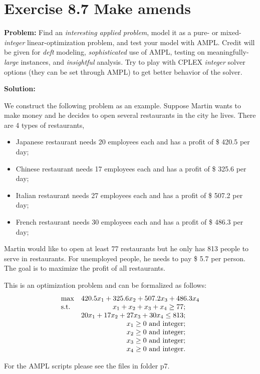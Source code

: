 \section{Exercise 8.7 Make amends}
\textbf{Problem:} Find an \textit{interesting applied problem}, model it as a pure- or mixed-\textit{integer} linear-optimization problem, and test your model with AMPL. Credit will be given for \textit{deft} modeling, \textit{sophisticated} use of AMPL, testing on meaningfully-\textit{large} instances, and \textit{insightful} analysis. Try to play with CPLEX \textit{integer} solver options (they can be set through AMPL) to get better behavior of the solver.

\textbf{Solution:} 

We construct the following problem as an example. Suppose Martin wants to make money and he decides to open several restaurants in the city he lives. There are 4 types of restaurants, 
\begin{itemize}
\item Japanese restaurant needs 20 employees each and has a profit of \$ 420.5 per day;
\item Chinese restaurant needs 17 employees each and has a profit of \$ 325.6 per day;
\item Italian restaurant needs 27 employees each and has a profit of \$ 507.2 per day;
\item French restaurant needs 30 employees each and has a profit of \$ 486.3 per day;
\end{itemize}

Martin would like to open at least 77 restaurants but he only has 813 people to serve in restaurants. For unemployed people, he needs to pay \$ 5.7 per person. The goal is to maximize the profit of all restaurants. 

This is an optimization problem and can be formalized as follows:
\begin{equation}
\label{eq: martin}
  \begin{array}{lrcll}
    \max
    & \multicolumn{4}{l}{420.5x_1+325.6x_2+507.2x_3+486.3x_4} \\
    \text{s.t.}
    & x_1+x_2+x_3+x_4\geq{}77; \\
    & 20x_1+17x_2+27x_3+30x_4\leq{}813; \\
    & x_1 \geq 0 \text{ and integer};\\
    & x_2 \geq 0 \text{ and integer};\\
    & x_3 \geq 0 \text{ and integer};\\
    & x_4 \geq 0 \text{ and integer}.\\
  \end{array}
\end{equation}

For the AMPL scripts please see the files in folder p7.
